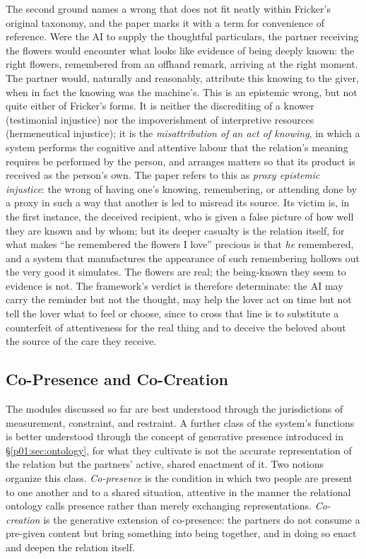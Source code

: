 \documentclass[11pt,a4paper]{article}
\begin{document}
The second ground names a wrong that does not fit neatly within Fricker's original taxonomy, and the paper marks it with a term for convenience of reference. Were the AI to supply the thoughtful particulars, the partner receiving the flowers would encounter what looks like evidence of being deeply known: the right flowers, remembered from an offhand remark, arriving at the right moment. The partner would, naturally and reasonably, attribute this knowing to the giver, when in fact the knowing was the machine's. This is an epistemic wrong, but not quite either of Fricker's forms. It is neither the discrediting of a knower (testimonial injustice) nor the impoverishment of interpretive resources (hermeneutical injustice); it is the \emph{misattribution of an act of knowing}, in which a system performs the cognitive and attentive labour that the relation's meaning requires be performed by the person, and arranges matters so that its product is received as the person's own. The paper refers to this as \emph{proxy epistemic injustice}: the wrong of having one's knowing, remembering, or attending done by a proxy in such a way that another is led to misread its source. Its victim is, in the first instance, the deceived recipient, who is given a false picture of how well they are known and by whom; but its deeper casualty is the relation itself, for what makes ``he remembered the flowers I love'' precious is that \emph{he} remembered, and a system that manufactures the appearance of such remembering hollows out the very good it simulates. The flowers are real; the being-known they seem to evidence is not. The framework's verdict is therefore determinate: the AI may carry the reminder but not the thought, may help the lover act on time but not tell the lover what to feel or choose, since to cross that line is to substitute a counterfeit of attentiveness for the real thing and to deceive the beloved about the source of the care they receive.

\subsection{Co-Presence and Co-Creation}\label{p01:sec:cocreation}

The modules discussed so far are best understood through the jurisdictions of measurement, constraint, and restraint. A further class of the system's functions is better understood through the concept of generative presence introduced in §\ref{p01:sec:ontology}, for what they cultivate is not the accurate representation of the relation but the partners' active, shared enactment of it. Two notions organize this class. \emph{Co-presence} is the condition in which two people are present to one another and to a shared situation, attentive in the manner the relational ontology calls presence rather than merely exchanging representations. \emph{Co-creation} is the generative extension of co-presence: the partners do not consume a pre-given content but bring something into being together, and in doing so enact and deepen the relation itself.
\end{document}
